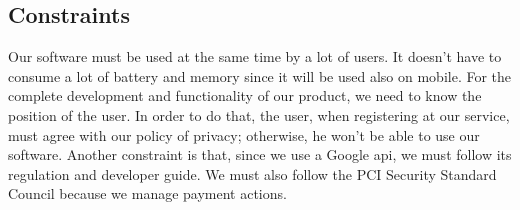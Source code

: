 
\subsection{Constraints} \label{subsec:constraints}
Our software must be used at the same time by a lot of users. It doesn't have to consume a lot of battery and memory since it will be used also on mobile. 
For the complete development and functionality of our product, we need to know the position of the user. In order to do that, the user, when registering at our service, must agree with our policy of privacy; otherwise, he won't be able to use our software.
Another constraint is that, since we use a Google \acs{api}, we must follow its regulation and developer guide. We must also follow the PCI Security Standard Council because we manage payment actions.


